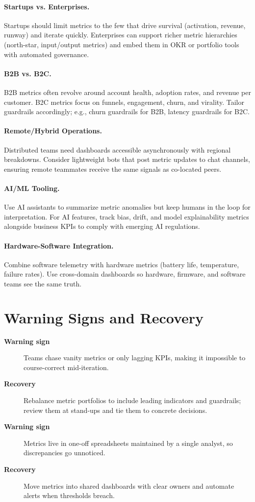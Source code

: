 \paragraph{Startups vs. Enterprises.} Startups should limit metrics to the few that drive survival (activation, revenue, runway) and iterate quickly. Enterprises can support richer metric hierarchies (north-star, input/output metrics) and embed them in OKR or portfolio tools with automated governance.

\paragraph{B2B vs. B2C.} B2B metrics often revolve around account health, adoption rates, and revenue per customer. B2C metrics focus on funnels, engagement, churn, and virality. Tailor guardrails accordingly; e.g., churn guardrails for B2B, latency guardrails for B2C.

\paragraph{Remote/Hybrid Operations.} Distributed teams need dashboards accessible asynchronously with regional breakdowns. Consider lightweight bots that post metric updates to chat channels, ensuring remote teammates receive the same signals as co-located peers.

\paragraph{AI/ML Tooling.} Use AI assistants to summarize metric anomalies but keep humans in the loop for interpretation. For AI features, track bias, drift, and model explainability metrics alongside business KPIs to comply with emerging AI regulations.

\paragraph{Hardware-Software Integration.} Combine software telemetry with hardware metrics (battery life, temperature, failure rates). Use cross-domain dashboards so hardware, firmware, and software teams see the same truth.
\section{Warning Signs and Recovery}
\label{sec:metrics-warning}
\begin{description}
    \item[\textbf{Warning sign}] Teams chase vanity metrics or only lagging KPIs, making it impossible to course-correct mid-iteration.
    \item[\textbf{Recovery}] Rebalance metric portfolios to include leading indicators and guardrails; review them at stand-ups and tie them to concrete decisions.
    \item[\textbf{Warning sign}] Metrics live in one-off spreadsheets maintained by a single analyst, so discrepancies go unnoticed.
    \item[\textbf{Recovery}] Move metrics into shared dashboards with clear owners and automate alerts when thresholds breach.
\end{description}

